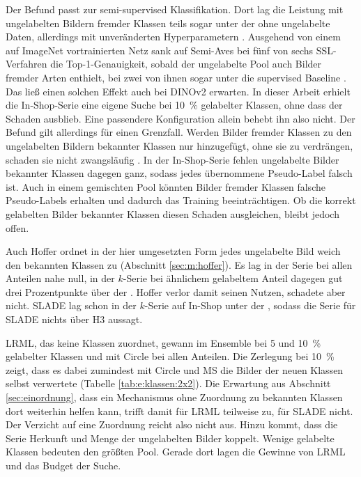 Der Befund passt zur semi-supervised Klassifikation. Dort lag die Leistung mit ungelabelten Bildern fremder Klassen teils sogar unter der ohne ungelabelte Daten, allerdings mit unveränderten Hyperparametern \cite{oliver_realistic_2018}. Ausgehend von einem auf ImageNet vortrainierten Netz sank auf Semi-Aves bei fünf von sechs \ac{SSL}-Verfahren die Top-1-Genauigkeit, sobald der ungelabelte Pool auch Bilder fremder Arten enthielt, bei zwei von ihnen sogar unter die supervised Baseline \cite{su_realistic_2021}. Das ließ einen solchen Effekt auch bei DINOv2 erwarten. In dieser Arbeit erhielt die In-Shop-Serie eine eigene Suche bei \qty{10}{\percent} gelabelter Klassen, ohne dass der Schaden ausblieb. Eine passendere Konfiguration allein behebt ihn also nicht. Der Befund gilt allerdings für einen Grenzfall. Werden Bilder fremder Klassen zu den ungelabelten Bildern bekannter Klassen nur hinzugefügt, ohne sie zu verdrängen, schaden sie nicht zwangsläufig \cite{he_reevaluating_2025}. In der In-Shop-Serie fehlen ungelabelte Bilder bekannter Klassen dagegen ganz, sodass jedes übernommene Pseudo-Label falsch ist. Auch in einem gemischten Pool könnten Bilder fremder Klassen falsche Pseudo-Labels erhalten und dadurch das Training beeinträchtigen. Ob die korrekt gelabelten Bilder bekannter Klassen diesen Schaden ausgleichen, bleibt jedoch offen.

Auch Hoffer ordnet in der hier umgesetzten Form jedes ungelabelte Bild weich den bekannten Klassen zu (Abschnitt \ref{sec:m:hoffer}). Es lag in der Serie bei allen Anteilen nahe null, in der $k$-Serie bei ähnlichem gelabeltem Anteil dagegen gut drei Prozentpunkte über der \UEBL. Hoffer verlor damit seinen Nutzen, schadete aber nicht. \ac{SLADE} lag schon in der $k$-Serie auf In-Shop unter der \UEBL, sodass die Serie für \ac{SLADE} nichts über H3 aussagt. 

\ac{LRML}, das keine Klassen zuordnet, gewann im Ensemble bei 5 und \qty{10}{\percent} gelabelter Klassen und mit Circle bei allen Anteilen. Die Zerlegung bei \qty{10}{\percent} zeigt, dass es dabei zumindest mit Circle und \ac{MS} die Bilder der neuen Klassen selbst verwertete (Tabelle \ref{tab:e:klassen:2x2}). Die Erwartung aus Abschnitt \ref{sec:einordnung}, dass ein Mechanismus ohne Zuordnung zu bekannten Klassen dort weiterhin helfen kann, trifft damit für \ac{LRML} teilweise zu, für \ac{SLADE} nicht. Der Verzicht auf eine Zuordnung reicht also nicht aus. Hinzu kommt, dass die Serie Herkunft und Menge der ungelabelten Bilder koppelt. Wenige gelabelte Klassen bedeuten den größten Pool. Gerade dort lagen die Gewinne von \ac{LRML} und das Budget der Suche.

